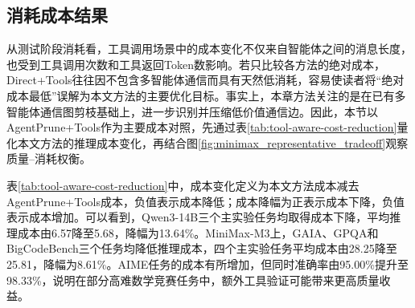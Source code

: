 \subsection{消耗成本结果}

从测试阶段消耗看，工具调用场景中的成本变化不仅来自智能体之间的消息长度，也受到工具调用次数和工具返回Token数影响。若只比较各方法的绝对成本，Direct+Tools往往因不包含多智能体通信而具有天然低消耗，容易使读者将“绝对成本最低”误解为本文方法的主要优化目标。事实上，本章方法关注的是在已有多智能体通信图剪枝基础上，进一步识别并压缩低价值通信边。因此，本节以AgentPrune+Tools作为主要成本对照，先通过表\ref{tab:tool-aware-cost-reduction}量化本文方法的推理成本变化，再结合图\ref{fig:minimax_representative_tradeoff}观察质量--消耗权衡。

\begin{table}[H]
  \centering
  \caption{本文方法相对AgentPrune+Tools的主实验推理成本对比}
  \label{tab:tool-aware-cost-reduction}
\end{table}

表\ref{tab:tool-aware-cost-reduction}中，成本变化定义为本文方法成本减去AgentPrune+Tools成本，负值表示成本降低；成本降幅为正表示成本下降，负值表示成本增加。可以看到，Qwen3-14B三个主实验任务均取得成本下降，平均推理成本由6.57降至5.68，降幅为13.64\%。MiniMax-M3上，GAIA、GPQA和BigCodeBench三个任务均降低推理成本，四个主实验任务平均成本由28.25降至25.81，降幅为8.61\%。AIME任务的成本有所增加，但同时准确率由95.00\%提升至98.33\%，说明在部分高难数学竞赛任务中，额外工具验证可能带来更高质量收益。

